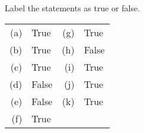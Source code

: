 Label the statements as true or false.
\begin{center}
\begin{tabular}{r l r l}
\toprule
(a) & True & (g) & True \\
(b) & True & (h) & False \\
(c) & True & (i) & True \\
(d) & False & (j) & True  \\
(e) & False & (k) & True \\
(f) & True & \\
\bottomrule
\end{tabular}
\end{center}
